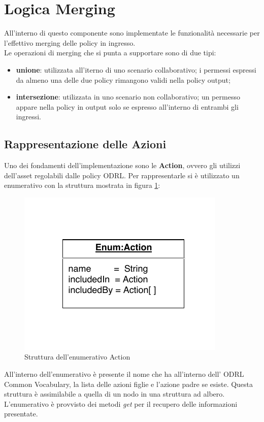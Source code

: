\documentclass[12pt,a4paper,twoside]{book}
\begin{document}
\section{Logica Merging}
All'interno di questo componente sono implementate le funzionalità necessarie per l'effettivo merging delle policy in ingresso.\\
Le operazioni di merging che si punta a supportare sono di due tipi:
\begin{itemize}
\item \textbf{unione}: utilizzata all'iterno di uno scenario collaborativo; i permessi espressi da almeno una delle due policy rimangono validi nella policy output;
\item \textbf{intersezione}: utilizzata in uno scenario non collaborativo; un permesso appare nella policy in output solo se espresso all'interno di entrambi gli ingressi.
\end{itemize}
\subsection{Rappresentazione delle Azioni}\label{enumAction}
Uno dei fondamenti dell'implementazione sono le \textbf{Action}, ovvero gli utilizzi dell'asset regolabili dalle policy ODRL. Per rappresentarle si è utilizzato un enumerativo con la struttura mostrata in figura \ref{imgActionEnum}:
\begin{figure}[H]
\centering
\includegraphics[scale=1.00]{../immagini/enumAction}
\caption{Struttura dell'enumerativo Action}
\label{imgActionEnum}
\end{figure}
All'interno dell'enumerativo è presente il nome che ha all'interno dell' ODRL Common Vocabulary, la lista delle azioni figlie e l'azione padre se esiste. Questa struttura è assimilabile a quella di un nodo in una struttura ad albero. L'enumerativo è provvisto dei metodi \textit{get} per il recupero delle informazioni presentate.
\end{document}
